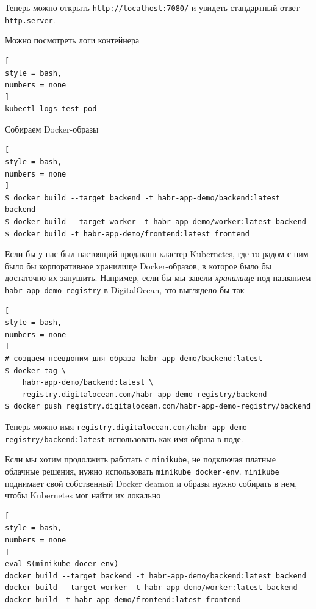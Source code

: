\documentclass[%
	11pt,
	a4paper,
	utf8,
		]{article}
\begin{document}
Теперь можно открыть \verb|http://localhost:7080/| и увидеть стандартный ответ \verb*|http.server|.

Можно посмотреть логи контейнера
\begin{lstlisting}[
style = bash,
numbers = none
]
kubectl logs test-pod
\end{lstlisting}

Собираем Docker-образы
\begin{lstlisting}[
style = bash,
numbers = none
]
$ docker build --target backend -t habr-app-demo/backend:latest backend
$ docker build --target worker -t habr-app-demo/worker:latest backend
$ docker build -t habr-app-demo/frontend:latest frontend
\end{lstlisting}

Если бы у нас был настоящий продакшн-кластер Kubernetes, где-то радом с ним было бы корпоративное хранилище Docker-образов, в которое было бы достаточно их запушить. Например, если бы мы завели \emph{хранилище} под названием \verb*|habr-app-demo-registry| в DigitalOcean, это выглядело бы так
\begin{lstlisting}[
style = bash,
numbers = none
]
# создаем псевдоним для образа habr-app-demo/backend:latest
$ docker tag \
    habr-app-demo/backend:latest \
    registry.digitalocean.com/habr-app-demo-registry/backend
$ docker push registry.digitalocean.com/habr-app-demo-registry/backend
\end{lstlisting}

Теперь можно имя \verb*|registry.digitalocean.com/habr-app-demo-registry/backend:latest| использовать как имя образа в поде.

Если мы хотим продолжить работать с \verb*|minikube|, не подключая платные облачные решения, нужно использовать \verb|minikube docker-env|. \verb*|minikube| поднимает свой собственный Docker deamon и образы нужно собирать в нем, чтобы Kubernetes мог найти их локально
\begin{lstlisting}[
style = bash,
numbers = none
]
eval $(minikube docer-env)
docker build --target backend -t habr-app-demo/backend:latest backend
docker build --target worker -t habr-app-demo/worker:latest backend
docker build -t habr-app-demo/frontend:latest frontend
\end{lstlisting}
\end{document}
